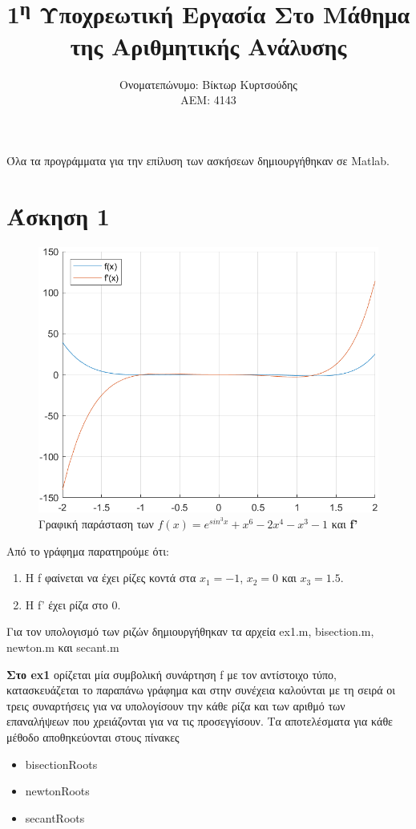 \documentclass[a4paper,11pt]{article}
\title{1\textsuperscript{η} Υποχρεωτική Εργασία Στο Μάθημα της Αριθμητικής Ανάλυσης}
\author{Ονοματεπώνυμο: Βίκτωρ Κυρτσούδης \\ ΑΕΜ: 4143}
\date{}
\begin{document}
\maketitle
\begin{flushleft}

Όλα τα προγράμματα για την επίλυση των ασκήσεων δημιουργήθηκαν σε Matlab.

\section*{Άσκηση 1}
\begin{figure}[ht]
    \caption*{Γραφική παράσταση των $f(x) = e^{sin^3x}+x^6-2x^4-x^3-1$ και \textbf{f'}}
    \includegraphics[width=\textwidth]{ex1plot.png}
\end{figure}

Από το γράφημα παρατηρούμε ότι:
\begin{enumerate}
    \item Η f φαίνεται να έχει ρίζες κοντά στα $x_1=-1$, $x_2=0$ και $x_3=1.5$.
    \item Η f' έχει ρίζα στο 0.
\end{enumerate}

Για τον υπολογισμό των ριζών δημιουργήθηκαν τα αρχεία ex1.m, bisection.m, newton.m και secant.m \newline

\textbf{Στο ex1} ορίζεται μία συμβολική συνάρτηση f με τον αντίστοιχο τύπο, κατασκευάζεται το παραπάνω γράφημα και στην συνέχεια καλούνται με τη σειρά οι τρεις συναρτήσεις για να υπολογίσουν την κάθε ρίζα και των αριθμό των επαναλήψεων που χρειάζονται για να τις προσεγγίσουν. Τα αποτελέσματα για κάθε μέθοδο αποθηκεύονται στους πίνακες 
\begin{itemize}
    \item bisectionRoots
    \item newtonRoots
    \item secantRoots
\end{itemize}


\end{flushleft}
\end{document}
